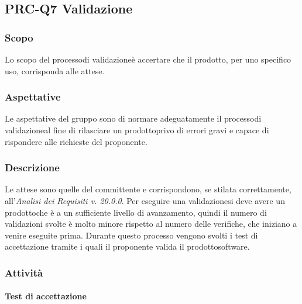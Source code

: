 \subsection{PRC-Q7 Validazione}

	\subsubsection{Scopo}
	Lo scopo del processo\glosp di validazione\glosp è accertare che il prodotto\glo, per uno specifico uso, corrisponda alle attese.
	
	\subsubsection{Aspettative}
	Le aspettative del gruppo sono di normare adeguatamente il processo\glosp di validazione\glosp al fine di rilasciare un prodotto\glosp privo di errori gravi e capace di rispondere alle richieste del proponente.
	
	\subsubsection{Descrizione}
	Le attese sono quelle del committente e corrispondono, se stilata correttamente, all'\textit{Analisi dei Requisiti v. 20.0.0}. 
	Per eseguire una validazione\glosp si deve avere un prodotto\glosp che è a un sufficiente livello di avanzamento, quindi il numero di validazioni svolte è molto minore rispetto al numero delle verifiche, che iniziano a venire eseguite prima.
	Durante questo processo vengono svolti i test di accettazione tramite i quali il proponente valida il prodotto\glosp software.
	
	\subsubsection{Attività}
		\paragraph{Test di accettazione}

